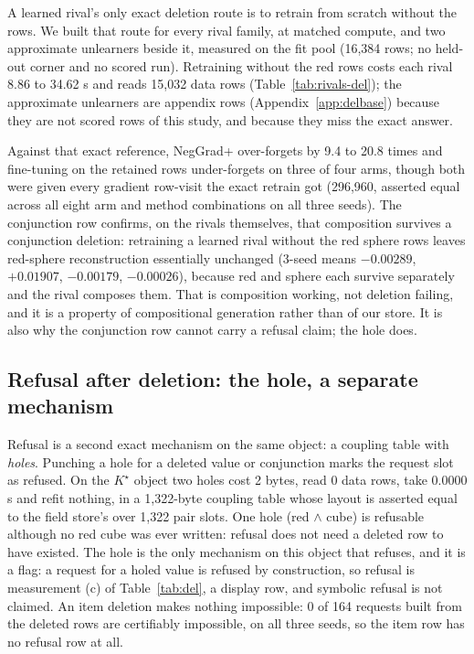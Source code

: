 \documentclass{article} %
\newcommand{\Kstar}{\ensuremath{K^{\star}}}
\begin{document}
A learned rival's only exact deletion route is to retrain from scratch without the rows. We
built that route for every rival family, at matched compute, and two approximate unlearners
beside it, measured on the fit pool (16,384 rows; no held-out corner and no scored run).
Retraining without the red rows costs each rival 8.86 to 34.62 s and reads 15,032 data rows
(Table~\ref{tab:rivals-del}); the approximate unlearners are appendix rows
(Appendix~\ref{app:delbase}) because they are not scored rows of this study, and because
they miss the exact answer. %

\noindent Against that exact reference, NegGrad+ over-forgets by 9.4 to 20.8 times and
fine-tuning on the retained rows under-forgets on three of four arms, though both were given
every gradient row-visit the exact retrain got (296,960, asserted equal across all eight arm
and method combinations on all three seeds). %
The conjunction row confirms, on the rivals themselves, that composition survives a
conjunction deletion: retraining a learned rival without the red sphere rows leaves red-sphere
reconstruction essentially unchanged (3-seed means $-0.00289$, $+0.01907$, $-0.00179$,
$-0.00026$), because red and sphere each survive separately and the rival composes them.
That is composition working, not deletion failing, and it is a property of compositional
generation rather than of our store. It is also why the conjunction row cannot carry a
refusal claim; the hole does.

\subsection{Refusal after deletion: the hole, a separate mechanism}
\label{sec:hole}

Refusal is a second exact mechanism on the same object: a coupling table with \emph{holes}.
Punching a hole for a deleted value or conjunction marks the request slot as refused. On the
$\Kstar$ object two holes cost 2 bytes, read 0 data rows, take 0.0000 s and refit nothing, in
a 1,322-byte coupling table whose layout is asserted equal to the field store's over 1,322 pair
slots. %
One hole (red $\wedge$ cube) is refusable although no red cube was ever written: refusal does
not need a deleted row to have existed. %
The hole is the only mechanism on this object that refuses, and it is a flag: a request for a
holed value is refused by construction, so refusal is measurement (c) of Table~\ref{tab:del}, a
display row, and symbolic refusal is not claimed. An item deletion makes nothing impossible: 0 of 164
requests built from the deleted rows are certifiably impossible, on all three seeds, so the
item row has no refusal row at all. %
\end{document}
